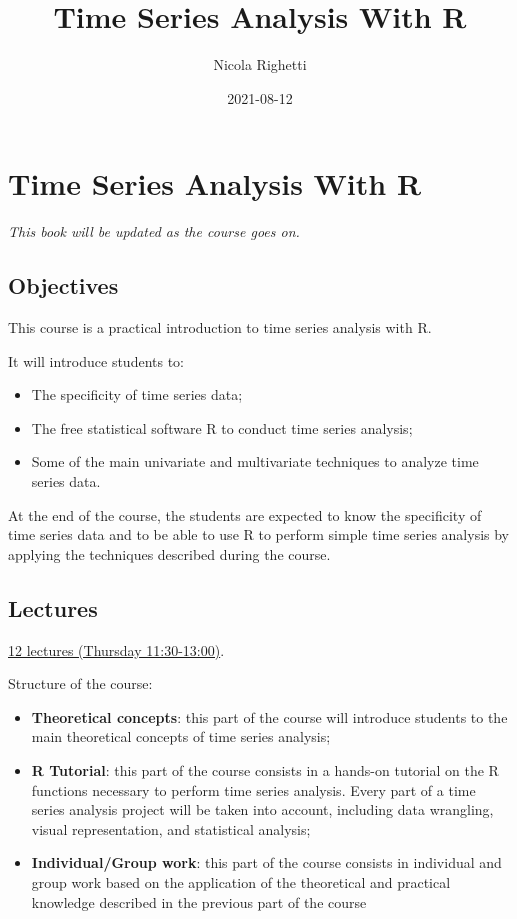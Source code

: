 \documentclass[
]{article}
\title{Time Series Analysis With R}
\author{Nicola Righetti}
\date{2021-08-12}
\providecommand{\tightlist}{%
  \setlength{\itemsep}{0pt}\setlength{\parskip}{0pt}}
\begin{document}
\maketitle

{
\setcounter{tocdepth}{2}
\tableofcontents
}
\hypertarget{time-series-analysis-with-r}{%
\section{Time Series Analysis With R}\label{time-series-analysis-with-r}}

\emph{This book will be updated as the course goes on.}

\hypertarget{objectives}{%
\subsection{Objectives}\label{objectives}}

This course is a practical introduction to time series analysis with R.

It will introduce students to:

\begin{itemize}
\tightlist
\item
  The specificity of time series data;
\item
  The free statistical software R to conduct time series analysis;
\item
  Some of the main univariate and multivariate techniques to analyze time series data.
\end{itemize}

At the end of the course, the students are expected to know the specificity of time series data and to be able to use R to perform simple time series analysis by applying the techniques described during the course.

\hypertarget{lectures}{%
\subsection{Lectures}\label{lectures}}

\href{https://ufind.univie.ac.at/de/course.html?lv=220050\&semester=2021S}{12 lectures (Thursday 11:30-13:00)}.

Structure of the course:

\begin{itemize}
\tightlist
\item
  \textbf{Theoretical concepts}: this part of the course will introduce students to the main theoretical concepts of time series analysis;
\item
  \textbf{R Tutorial}: this part of the course consists in a hands-on tutorial on the R functions necessary to perform time series analysis. Every part of a time series analysis project will be taken into account, including data wrangling, visual representation, and statistical analysis;
\item
  \textbf{Individual/Group work}: this part of the course consists in individual and group work based on the application of the theoretical and practical knowledge described in the previous part of the course
\end{itemize}
\end{document}
